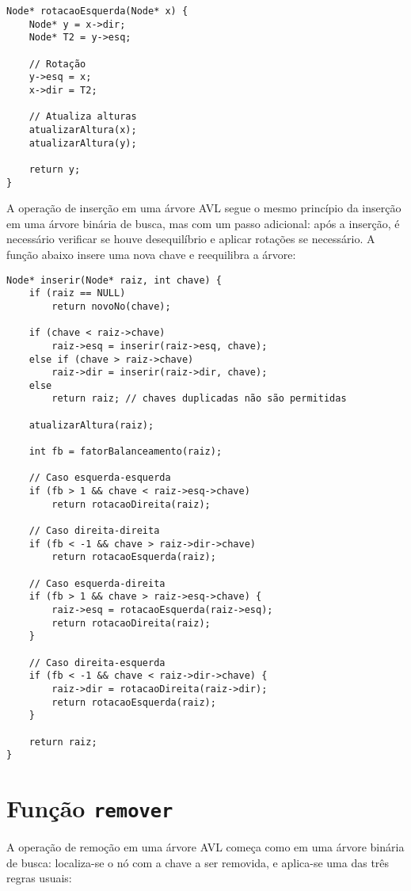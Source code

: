 \begin{lstlisting}
Node* rotacaoEsquerda(Node* x) {
    Node* y = x->dir;
    Node* T2 = y->esq;

    // Rotação
    y->esq = x;
    x->dir = T2;

    // Atualiza alturas
    atualizarAltura(x);
    atualizarAltura(y);

    return y;
}
\end{lstlisting}


A operação de inserção em uma árvore AVL segue o mesmo princípio da inserção em uma árvore binária de busca, mas com um passo adicional: após a inserção, é necessário verificar se houve desequilíbrio e aplicar rotações se necessário. 
A função abaixo insere uma nova chave e reequilibra a árvore:

\begin{lstlisting}
Node* inserir(Node* raiz, int chave) {
    if (raiz == NULL)
        return novoNo(chave);

    if (chave < raiz->chave)
        raiz->esq = inserir(raiz->esq, chave);
    else if (chave > raiz->chave)
        raiz->dir = inserir(raiz->dir, chave);
    else
        return raiz; // chaves duplicadas não são permitidas

    atualizarAltura(raiz);

    int fb = fatorBalanceamento(raiz);

    // Caso esquerda-esquerda
    if (fb > 1 && chave < raiz->esq->chave)
        return rotacaoDireita(raiz);

    // Caso direita-direita
    if (fb < -1 && chave > raiz->dir->chave)
        return rotacaoEsquerda(raiz);

    // Caso esquerda-direita
    if (fb > 1 && chave > raiz->esq->chave) {
        raiz->esq = rotacaoEsquerda(raiz->esq);
        return rotacaoDireita(raiz);
    }

    // Caso direita-esquerda
    if (fb < -1 && chave < raiz->dir->chave) {
        raiz->dir = rotacaoDireita(raiz->dir);
        return rotacaoEsquerda(raiz);
    }

    return raiz;
}
\end{lstlisting}

\section*{Função {\tt remover}}

A operação de remoção em uma árvore AVL começa como em uma árvore binária de busca: localiza-se o nó com a chave a ser removida, e aplica-se uma das três regras usuais:

